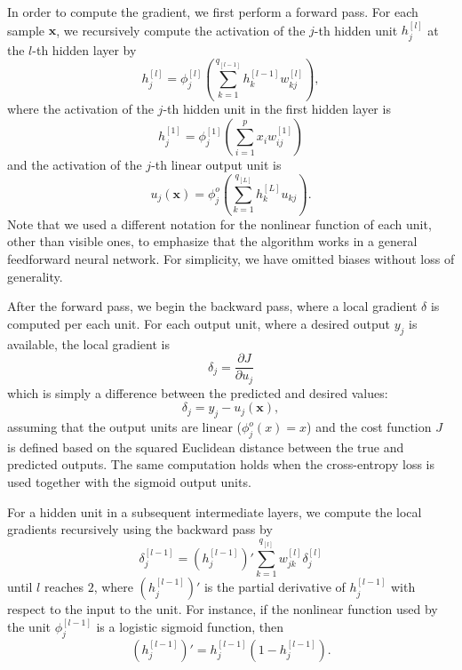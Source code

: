 \documentclass{now}
\newcommand{\qlay}[1]{\left[#1\right]}
\newcommand{\vect}[1]{\mathbf{#1}}
\newcommand{\vx}[0]{\vect{x}}
\begin{document}
In order to compute the gradient, we first perform a
forward pass. For each sample $\vx$, we recursively
compute the activation of the $j$-th hidden unit
$h_j^{\qlay{l}}$
at the $l$-th hidden layer by
\[
h_j^{\qlay{l}} = \phi_j^{\qlay{l}}
\left(\sum_{k=1}^{q_{\qlay{l-1}}} h_k^{\qlay{l-1}}
w_{kj}^{\qlay{l}}\right),
\]
where the activation of the $j$-th hidden unit in the first
hidden layer is
\[
h_j^{\qlay{1}} = \phi_j^{\qlay{1}} \left(\sum_{i=1}^p x_i
w_{ij}^{\qlay{1}}\right)
\]
and the activation of the $j$-th linear output unit is 
\[
u_j(\vx) = \phi_j^{o} \left( \sum_{k=1}^{q_{\qlay{L}}}
h_{k}^{\qlay{L}} u_{kj}
\right).
\]
Note that we used a different notation for the nonlinear
function of each unit, other than visible ones, to emphasize
that the algorithm works in a general feedforward neural
network. 
For simplicity, we have omitted biases without loss of
generality.

After the forward pass, we begin the backward pass, where a local
gradient $\delta$ is computed per each unit.  For each output
unit, where a desired output $y_j$ is available, the local
gradient is
\[
\delta_j = \frac{\partial J}{\partial u_j} 
\]
which is simply a difference between the predicted and
desired values:
\[
\delta_j = y_j - u_j(\vx),
\]
assuming that the output units are linear
($\phi_j^o(x) = x$) and the cost function $J$ is defined
based on the squared Euclidean distance between the true and
predicted outputs. The same computation holds when the
cross-entropy loss is used together with the sigmoid output
units.

For a hidden unit in a subsequent intermediate layers, we
compute the local gradients recursively using the backward
pass
by
\[
\delta_j^{\qlay{l-1}} = \left(h_j^{\qlay{l-1}}\right)'
\sum_{k=1}^{q_{\qlay{l}}}
w_{jk}^{\qlay{l}} \delta_j^{\qlay{l}}
\]
until $l$ reaches $2$, where $\left(h_j^{\qlay{l-1}}\right)'$ is
the partial derivative of $h_j^{\qlay{l-1}}$ with respect to the
input to the unit. For instance, if the nonlinear function
used by the unit $\phi_j^{\qlay{l-1}}$ is a logistic sigmoid
function, then
\[
\left(h_j^{\qlay{l-1}}\right)' = h_j^{\qlay{l-1}} \left( 1 -
h_j^{\qlay{l-1}} \right).
\]
\end{document}
